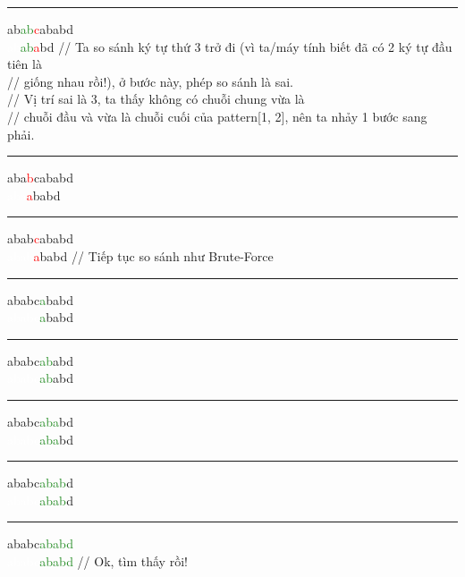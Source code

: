 \documentclass[a4paper,11pt]{article}
\begin{document}
\begin{enumerate}
			\vspace*{2mm}
			\hrule
			ab\textcolor{ForestGreen}{ab}\textcolor{red}{c}ababd\\
			\textcolor{white}{ab}\textcolor{ForestGreen}{ab}\textcolor{red}{a}bd 		\hspace*{1.4cm} // Ta so sánh ký tự thứ 3 trở đi (vì ta/máy tính biết đã có 2 ký tự đầu tiên là  \\
																						\hspace*{2.9cm} // giống nhau rồi!), ở bước này, phép so sánh là sai. \\
																						\hspace*{2.9cm} // Vị trí sai là 3,  ta thấy không có chuỗi chung vừa là \\
																						\hspace*{2.9cm} // chuỗi đầu và vừa là chuỗi cuối của pattern[1, 2], nên ta nhảy 1 bước sang phải.
			\vspace*{2mm}
			\hrule
			aba\textcolor{red}{b}cababd\\
			\textcolor{white}{aba}\textcolor{red}{a}babd 

			\vspace*{2mm}
			\hrule
			abab\textcolor{red}{c}ababd\\
			\textcolor{white}{abab}\textcolor{red}{a}babd 		\hspace*{1.3cm} // Tiếp tục so sánh như Brute-Force

			\vspace*{2mm}
			\hrule
			ababc\textcolor{ForestGreen}{a}babd\\
			\textcolor{white}{ababc}\textcolor{ForestGreen}{a}babd 

			\vspace*{2mm}
			\hrule
			ababc\textcolor{ForestGreen}{ab}abd\\
			\textcolor{white}{ababc}\textcolor{ForestGreen}{ab}abd 

			\vspace*{2mm}
			\hrule
			ababc\textcolor{ForestGreen}{aba}bd\\
			\textcolor{white}{ababc}\textcolor{ForestGreen}{aba}bd 

			\vspace*{2mm}
			\hrule
			ababc\textcolor{ForestGreen}{abab}d\\
			\textcolor{white}{ababc}\textcolor{ForestGreen}{abab}d 

			\vspace*{2mm}
			\hrule
			ababc\textcolor{ForestGreen}{ababd}\\
			\textcolor{white}{ababc}\textcolor{ForestGreen}{ababd} \hspace*{1.2cm} // Ok, tìm thấy rồi!
			

\end{enumerate}
\end{document}
